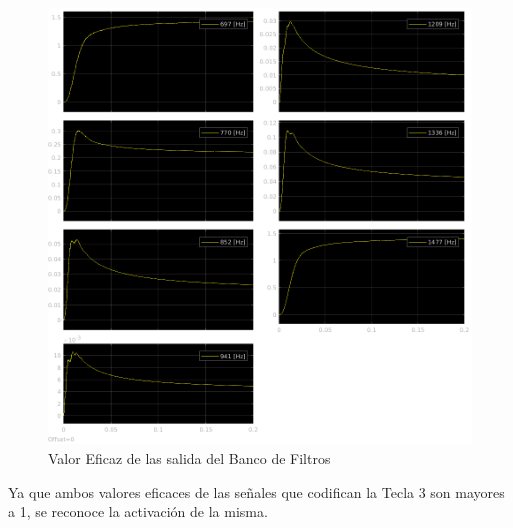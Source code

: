 \begin{figure}[H]
  \centering
  \includegraphics[width=\linewidth]{images/simulacion/fallas/rms/3.png}
  \caption{Valor Eficaz de las salida del Banco de Filtros }
  \label{fig:num_3_rms}
\end{figure}

Ya que ambos valores eficaces de las señales que codifican la Tecla 3 son mayores a 1, se reconoce la activación de la misma.


